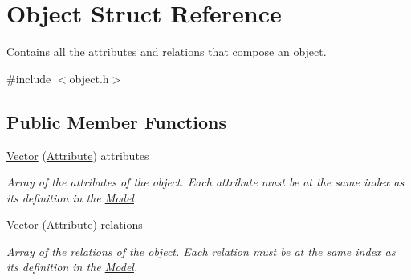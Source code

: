 \hypertarget{struct_object}{}\section{Object Struct Reference}
\label{struct_object}


Contains all the attributes and relations that compose an object.  




{\ttfamily \#include $<$object.\+h$>$}

\subsection*{Public Member Functions}
\begin{DoxyCompactItemize}
\item 
\hyperlink{struct_object_a36f216126b0832251d46dcecd359e02e}{Vector} (\hyperlink{struct_attribute}{Attribute}) attributes\hypertarget{struct_object_a36f216126b0832251d46dcecd359e02e}{}\label{struct_object_a36f216126b0832251d46dcecd359e02e}

\begin{DoxyCompactList}\small\item\em Array of the attributes of the object. Each attribute must be at the same index as its definition in the \hyperlink{struct_model}{Model}. \end{DoxyCompactList}\item 
\hyperlink{struct_object_ac892606b5212023b290f68e1ce902d71}{Vector} (\hyperlink{struct_attribute}{Attribute}) relations\hypertarget{struct_object_ac892606b5212023b290f68e1ce902d71}{}\label{struct_object_ac892606b5212023b290f68e1ce902d71}

\begin{DoxyCompactList}\small\item\em Array of the relations of the object. Each relation must be at the same index as its definition in the \hyperlink{struct_model}{Model}. \end{DoxyCompactList}\end{DoxyCompactItemize}
